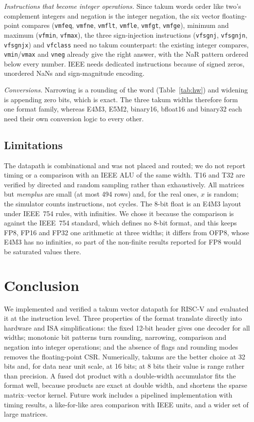\documentclass[conference]{IEEEtran}
\newcommand{\code}[1]{\texttt{#1}}
\begin{document}
\emph{Instructions that become integer operations.} Since takum words order like two's complement
integers and negation is the integer negation, the six vector floating-point compares
(\code{vmfeq}, \code{vmfne}, \code{vmflt}, \code{vmfle}, \code{vmfgt}, \code{vmfge}), minimum and
maximum (\code{vfmin}, \code{vfmax}), the three sign-injection instructions (\code{vfsgnj},
\code{vfsgnjn}, \code{vfsgnjx}) and \code{vfclass} need no takum counterpart: the existing integer
compares, \code{vmin}/\code{vmax} and \code{vneg} already give the right answer, with the NaR pattern
ordered below every number. IEEE needs dedicated instructions because of signed zeros, unordered NaNs
and sign-magnitude encoding.

\emph{Conversions.} Narrowing is a rounding of the word (Table~\ref{tab:hw}) and widening is appending
zero bits, which is exact. The three takum widths therefore form one
format family, whereas E4M3, E5M2, binary16, bfloat16 and binary32 each need their own conversion
logic to every other.

\subsection{Limitations}

The datapath is combinational and was not placed and routed; we do not report timing or a comparison
with an IEEE ALU of the same width. T16 and T32 are verified by directed and random sampling rather
than exhaustively. All matrices but \emph{memplus} are small (at most 494 rows) and, for the real ones, $x$ is random; the simulator counts
instructions, not cycles.
The 8-bit float is an E4M3 layout under IEEE~754 rules, with infinities. We chose it because the comparison
is against the IEEE~754 standard, which defines no 8-bit format, and this keeps FP8, FP16 and FP32 one
arithmetic at three widths; it differs from OFP8, whose E4M3 has no infinities, so part of the non-finite
results reported for FP8 would be saturated values there.

\section{Conclusion}

We implemented and verified a takum vector datapath for RISC-V and evaluated it at the instruction
level. Three properties of the format translate directly into hardware and ISA simplifications: the
fixed 12-bit header gives one decoder for all widths; monotonic bit patterns turn rounding, narrowing,
comparison and negation into integer operations; and the absence of flags and rounding modes removes
the floating-point CSR. Numerically, takums are the better choice at 32 bits and, for data near unit
scale, at 16 bits; at 8 bits their value is range rather than precision. A fused dot product with a
double-width accumulator fits the format well, because products are exact at double width, and shortens
the sparse matrix--vector kernel. Future work includes a pipelined implementation with timing results,
a like-for-like area comparison with IEEE units, and a wider set of large matrices.
\end{document}
